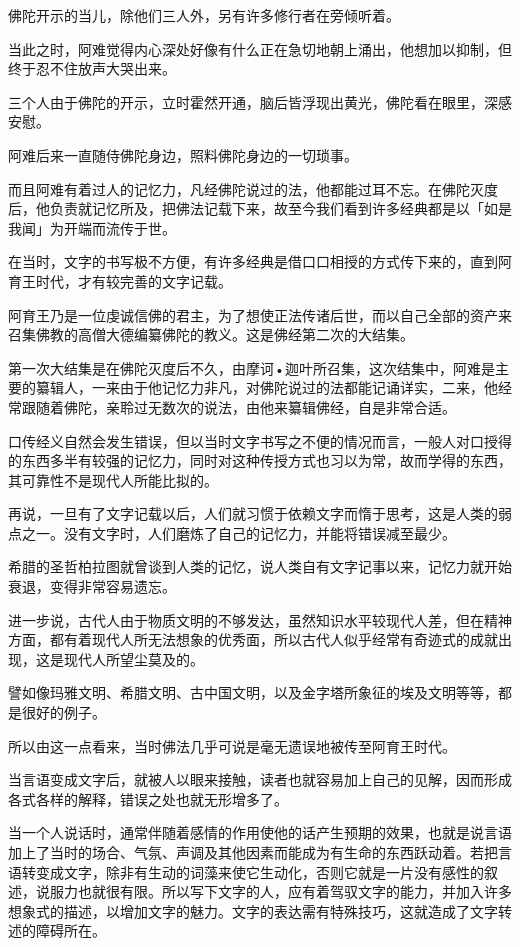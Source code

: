 \documentclass[twoside,openany]{book}
\begin{document}
佛陀开示的当儿，除他们三人外，另有许多修行者在旁倾听着。

当此之时，阿难觉得内心深处好像有什么正在急切地朝上涌出，他想加以抑制，但终于忍不住放声大哭出来。

三个人由于佛陀的开示，立时霍然开通，脑后皆浮现出黄光，佛陀看在眼里，深感安慰。

阿难后来一直随侍佛陀身边，照料佛陀身边的一切琐事。

而且阿难有着过人的记忆力，凡经佛陀说过的法，他都能过耳不忘。在佛陀灭度后，他负责就记忆所及，把佛法记载下来，故至今我们看到许多经典都是以「如是我闻」为开端而流传于世。

在当时，文字的书写极不方便，有许多经典是借口口相授的方式传下来的，直到阿育王时代，才有较完善的文字记载。

阿育王乃是一位虔诚信佛的君主，为了想使正法传诸后世，而以自己全部的资产来召集佛教的高僧大德编纂佛陀的教义。这是佛经第二次的大结集。

第一次大结集是在佛陀灭度后不久，由摩诃•迦叶所召集，这次结集中，阿难是主要的纂辑人，一来由于他记忆力非凡，对佛陀说过的法都能记诵详实，二来，他经常跟随着佛陀，亲聆过无数次的说法，由他来纂辑佛经，自是非常合适。

口传经义自然会发生错误，但以当时文字书写之不便的情况而言，一般人对口授得的东西多半有较强的记忆力，同时对这种传授方式也习以为常，故而学得的东西，其可靠性不是现代人所能比拟的。

再说，一旦有了文字记载以后，人们就习惯于依赖文字而惰于思考，这是人类的弱点之一。没有文字时，人们磨炼了自己的记忆力，并能将错误减至最少。

希腊的圣哲柏拉图就曾谈到人类的记忆，说人类自有文字记事以来，记忆力就开始衰退，变得非常容易遗忘。

进一步说，古代人由于物质文明的不够发达，虽然知识水平较现代人差，但在精神方面，都有着现代人所无法想象的优秀面，所以古代人似乎经常有奇迹式的成就出现，这是现代人所望尘莫及的。

譬如像玛雅文明、希腊文明、古中国文明，以及金字塔所象征的埃及文明等等，都是很好的例子。

所以由这一点看来，当时佛法几乎可说是毫无遗误地被传至阿育王时代。

当言语变成文字后，就被人以眼来接触，读者也就容易加上自己的见解，因而形成各式各样的解释，错误之处也就无形增多了。

当一个人说话时，通常伴随着感情的作用使他的话产生预期的效果，也就是说言语加上了当时的场合、气氛、声调及其他因素而能成为有生命的东西跃动着。若把言语转变成文字，除非有生动的词藻来使它生动化，否则它就是一片没有感性的叙述，说服力也就很有限。所以写下文字的人，应有着驾驭文字的能力，并加入许多想象式的描述，以增加文字的魅力。文字的表达需有特殊技巧，这就造成了文字转述的障碍所在。
\end{document}
